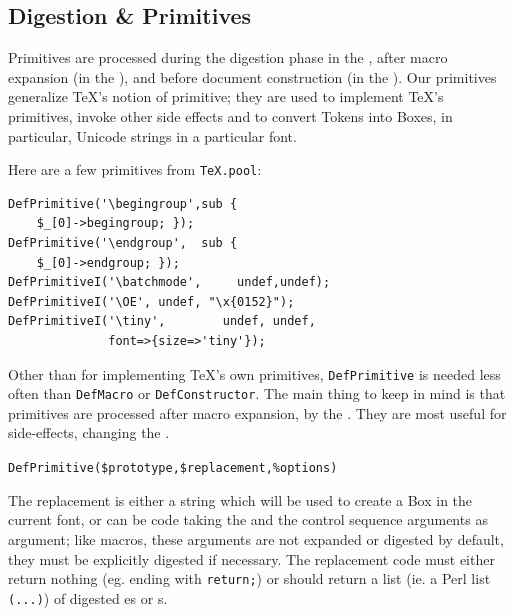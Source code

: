 \documentclass{book}
\newcommand{\ltxcode}{\lstinline[style=latexml]}
\begin{document}
\subsection[Digestion]{Digestion \& Primitives}\label{customization.latexml.digestion}
Primitives are processed during the digestion phase in the ,
after macro expansion (in the ),
and before document construction (in the ).
Our primitives generalize \TeX's notion of primitive; they are used to implement
\TeX's primitives, invoke other side effects and to convert Tokens into Boxes,
in particular, Unicode strings in a particular font.

Here are a few primitives from \texttt{TeX.pool}:
\begin{lstlisting}[style=latexml]
DefPrimitive('\begingroup',sub {
    $_[0]->begingroup; });
DefPrimitive('\endgroup',  sub {
    $_[0]->endgroup; });
DefPrimitiveI('\batchmode',     undef,undef);
DefPrimitiveI('\OE', undef, "\x{0152}");
DefPrimitiveI('\tiny',        undef, undef,
              font=>{size=>'tiny'});
\end{lstlisting}

Other than for implementing \TeX's own primitives,
\texttt{DefPrimitive} is needed less often than \texttt{DefMacro} or \texttt{DefConstructor}.
 The main thing to keep in mind
is that primitives are processed after macro expansion,
by the .  They are most useful for
side-effects, changing the .

\par\noindent\ltxcode|DefPrimitive($prototype,$replacement,%
\par

The replacement is either a string which will be used to create
a Box in the current font, or can be code taking the 
and the control sequence arguments as argument; like macros, these arguments
are not expanded or digested by default, they must be explicitly digested if necessary.
The replacement code must either return nothing (eg. ending with \ltxcode|return;|) or
should return a list (ie. a Perl list \ltxcode|(...)|)
of digested es or s.
\end{document}
